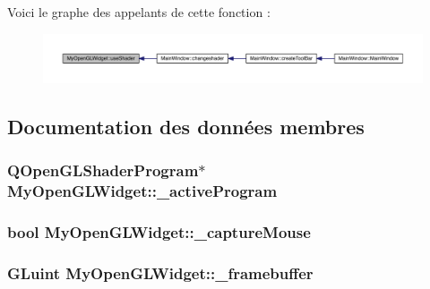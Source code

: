 Voici le graphe des appelants de cette fonction \+:
\nopagebreak
\begin{figure}[H]
\begin{center}
\leavevmode
\includegraphics[width=350pt]{class_my_open_g_l_widget_a87b9f933f545bf6f257820395771cc8b_icgraph}
\end{center}
\end{figure}




\subsection{Documentation des données membres}
\hypertarget{class_my_open_g_l_widget_a24571f61604a92b622b49609bc0f3f5b}{
\subsubsection[{\+\_\+active\+Program}]{\setlength{\rightskip}{0pt plus 5cm}Q\+Open\+G\+L\+Shader\+Program$\ast$ My\+Open\+G\+L\+Widget\+::\+\_\+active\+Program\hspace{0.3cm}{\ttfamily [private]}}}\label{class_my_open_g_l_widget_a24571f61604a92b622b49609bc0f3f5b}
\hypertarget{class_my_open_g_l_widget_af001d889fec5469aa3e67c11ae48b29d}{
\subsubsection[{\+\_\+capture\+Mouse}]{\setlength{\rightskip}{0pt plus 5cm}bool My\+Open\+G\+L\+Widget\+::\+\_\+capture\+Mouse\hspace{0.3cm}{\ttfamily [private]}}}\label{class_my_open_g_l_widget_af001d889fec5469aa3e67c11ae48b29d}
\hypertarget{class_my_open_g_l_widget_ab39ecf367a98c1bd5e1dbeeb8b44a255}{
\subsubsection[{\+\_\+framebuffer}]{\setlength{\rightskip}{0pt plus 5cm}G\+Luint My\+Open\+G\+L\+Widget\+::\+\_\+framebuffer\hspace{0.3cm}{\ttfamily [private]}}}\label{class_my_open_g_l_widget_ab39ecf367a98c1bd5e1dbeeb8b44a255}
